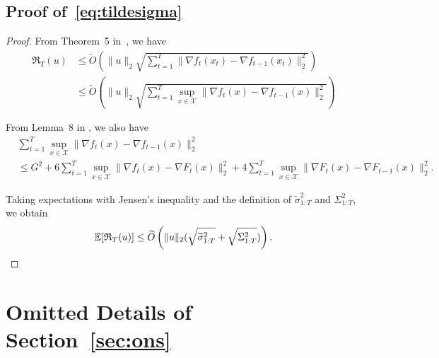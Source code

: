 \documentclass{article}
\theoremstyle{plain}
\theoremstyle{definition}
\theoremstyle{remark}
\newcommand{\cX}{\mathcal{X}}
\newcommand{\regret}{\mathfrak{R}}
\renewcommand{\tilde}{\widetilde}
\begin{document}
\subsection{Proof of~\eqref{eq:tildesigma}}\label{app:tildesigma}
\begin{proof}
    From Theorem~5 in~\cite{jacobsen2022parameter}, we have 
    \begin{align*}
        \regret_T(u) &\leq \tilde{O}\left(\|u\|_2 \sqrt{\sum_{t=1}^T \|\nabla f_t(x_t) - \nabla f_{t-1}(x_t)\|_2^2}\right)\\
        &\leq \tilde{O}\left(\|u\|_2 \sqrt{\sum_{t=1}^T \sup_{x\in \cX}\|\nabla f_t(x) - \nabla f_{t-1}(x)\|_2^2}\right)
    \end{align*}

    From Lemma~8 in \cite{chen2024optimistic}, we also have
    \begin{align*}
        &\sum_{t=1}^T \sup_{x\in\cX}\|\nabla f_t(x) - \nabla f_{t-1}(x)\|_2^2\\&\leq G^2+6\sum_{t=1}^T \sup_{x\in\cX}\|\nabla f_t(x) - \nabla F_{t}(x)\|_2^2 + 4\sum_{t=1}^T \sup_{x\in\cX}\|\nabla F_t(x) - \nabla F_{t-1}(x)\|_2^2.
    \end{align*}

    Taking expectations with Jensen's inequality and the definition of $\tilde{\sigma}_{1:T}^2$ and $\Sigma_{1:T}^2$, we obtain 
    \begin{equation*}
        \mathbb{E}[\regret_T(u)]\leq\tilde{O}\left(\|u\|_2 (\sqrt{\tilde{\sigma}_{1:T}^2} + \sqrt{\Sigma_{1:T}^2} )\right).\qedhere
    \end{equation*}
\end{proof}


\section{Omitted Details of Section~\ref{sec:ons}}
\end{document}
